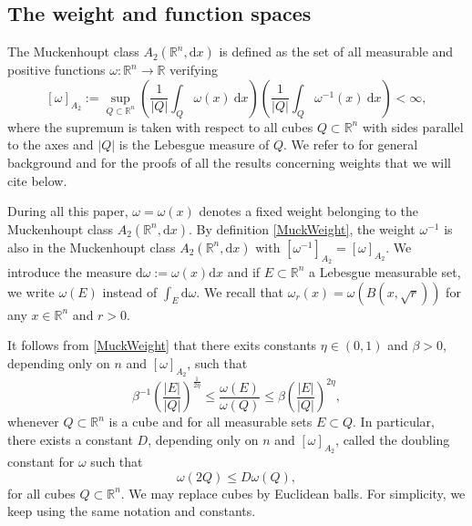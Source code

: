 \documentclass[12pt, letterpaper]{amsart}
\theoremstyle{definition}
\theoremstyle{remark}
\numberwithin{equation}{section}
\begin{document}
\subsection{The weight and function spaces}
The Muckenhoupt class $A_2(\mathbb{R}^n,\mathrm d x)$ is defined as the set of all measurable and positive functions $\omega : \mathbb{R}^n \rightarrow \mathbb{R}$ verifying 
\begin{equation}\label{MuckWeight}
      [ \omega  ]_{A_2}:= \sup_{Q \subset \mathbb{R}^n  } \left ( \frac{1}{|Q|} \int_Q \omega(x) \ \mathrm{d}x   \right ) \left ( \frac{1}{|Q|} \int_Q \omega^{-1}(x) \ \mathrm{d}x   \right ) < \infty,
\end{equation}
where the supremum is taken with respect to all cubes $Q \subset \mathbb{R}^n$ with sides parallel to the axes and $|Q|$ is the Lebesgue measure of $Q$. We refer to \cite[Ch. V]{Stein1993_HA} for general background and for the proofs of all the results concerning weights that we will cite below.

During all this paper, $\omega=\omega(x)$ denotes a fixed weight belonging to the Muckenhoupt class $A_2(\mathbb{R}^n,\mathrm d x)$. By definition \eqref{MuckWeight}, the weight $\omega^{-1}$ is also in the Muckenhoupt class $A_2(\mathbb{R}^n,\mathrm d x)$ with $  [ \omega^{-1}  ]_{A_2}=  [ \omega  ]_{A_2}$. We introduce the measure $\mathrm d \omega := \omega(x) \mathrm d x$ and if $E \subset \mathbb{R}^n$ a Lebesgue measurable set, we write $\omega(E)$ instead of $\int_E \mathrm d \omega$. We recall that $\omega_r(x)=\omega(B(x,\sqrt{r}))$ for any $x \in \mathbb{R}^n$ and $r>0$.


It follows from \eqref{MuckWeight} that there exits constants $\eta \in (0,1)$ and $\beta >0$, depending only on $n$ and $ [ \omega  ]_{A_2}$, such that 
\begin{equation}\label{MuckProportion}
\beta^{-1}\left ( \frac{\left | E \right |}{\left | Q \right |} \right )^{\frac{1}{2\eta }}\leq \frac{\omega(E)}{\omega(Q)}\leq \beta\left ( \frac{\left | E \right |}{\left | Q \right |} \right )^{2\eta},
\end{equation}
whenever $Q \subset \mathbb{R}^n$ is a cube and for all measurable sets $E \subset Q$. In particular, there exists a constant $D$, depending only on $n$ and $ [ \omega  ]_{A_2}$, called the doubling constant for $\omega$ such that
\begin{equation}\label{DoublingMuck}
    \omega(2Q)\leq D \omega(Q),
\end{equation}
for all cubes $Q \subset \mathbb{R}^n$. We may replace cubes by Euclidean balls. For simplicity, we keep using the same notation and constants.
\end{document}
